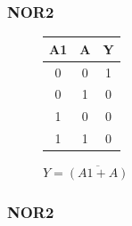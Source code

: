 \documentclass[aspectratio=169]{beamer}
\begin{document}
\begin{frame}
\frametitle{NOR2}
    \begin{figure}[h]
        \begin{center}
            \begin{circuitdiagram}{11}{6}
                \usgate
            \end{circuitdiagram}
            \hspace{2cm}
            \begin{tabular}{ c c|c } 
                A1 & A & Y \\ 
                \hline
                0 & 0 & 1 \\ 
                0 & 1 & 0 \\ 
                1 & 0 & 0 \\ 
                1 & 1 & 0 \\ 
            \end{tabular}
        \end{center}
    $Y = \overline{ (A1 + A) }$
    \end{figure}
\end{frame}

\begin{frame}
\frametitle{NOR2}
    \begin{figure}[h]
        \begin{center}
            \begin{circuitdiagram}{18}{20}
            \end{circuitdiagram}
        \end{center}
    \end{figure}
\end{frame}

\end{document}
